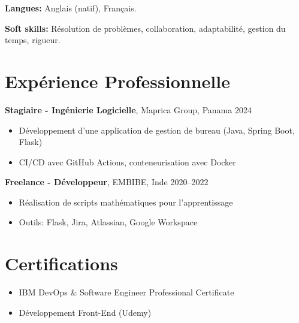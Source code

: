 \documentclass[10pt, letterpaper]{article}
\begin{document}
\vspace{2.1mm}
\textbf{Langues:} Anglais (natif), Fran\c{c}ais.

\vspace{2.1mm}
\textbf{Soft skills:} R\'esolution de probl\`emes, collaboration, adaptabilit\'e, gestion du temps, rigueur.

\section*{Exp\'erience Professionnelle}
\textbf{Stagiaire - Ing\'enierie Logicielle}, Maprica Group, Panama \hfill 2024
\begin{itemize}[leftmargin=*, topsep=2pt, itemsep=1pt]
\item D\'eveloppement d'une application de gestion de bureau (Java, Spring Boot, Flask)
\item CI/CD avec GitHub Actions, conteneurisation avec Docker
\end{itemize}

\textbf{Freelance - D\'eveloppeur}, EMBIBE, Inde \hfill 2020--2022
\begin{itemize}[leftmargin=*, topsep=2pt, itemsep=1pt]
\item R\'ealisation de scripts math\'ematiques pour l'apprentissage
\item Outils: Flask, Jira, Atlassian, Google Workspace
\end{itemize}

\section*{Certifications}
\begin{itemize}[leftmargin=*, topsep=2pt, itemsep=1pt]
\item IBM DevOps \& Software Engineer Professional Certificate
\item D\'eveloppement Front-End (Udemy)
\end{itemize}

\end{document}
